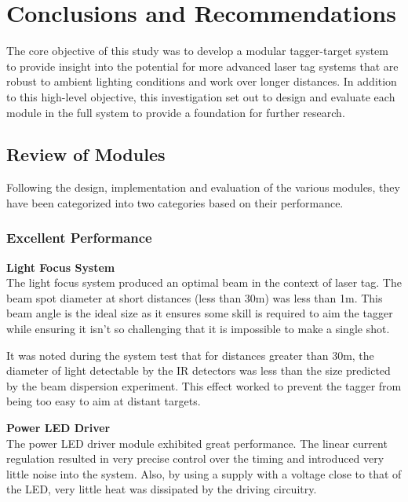\chapter{Conclusions and Recommendations}
\label{ch_conclusions}



The core objective of this study was to develop a modular tagger-target system to provide insight into the potential for more advanced laser tag systems that are robust to ambient lighting conditions and work over longer distances. In addition to this high-level objective, this investigation set out to design and evaluate each module in the full system to provide a foundation for further research.

\section{Review of Modules}
Following the design, implementation and evaluation of the various modules, they have been categorized into two categories based on their performance. %

\subsection{Excellent Performance}

\textbf{Light Focus System}\\
The light focus system produced an optimal beam in the context of laser tag. The beam spot diameter at short distances (less than 30m) was less than 1m. This beam angle is the ideal size as it ensures some skill is required to aim the tagger while ensuring it isn't so challenging that it is impossible to make a single shot.

It was noted during the system test that for distances greater than 30m, the diameter of light detectable by the IR detectors was less than the size predicted by the beam dispersion experiment. This effect worked to prevent the tagger from being too easy to aim at distant targets.

\textbf{Power LED Driver}\\
The power LED driver module exhibited great performance. The linear current regulation resulted in very precise control over the timing and introduced very little noise into the system. Also, by using a supply with a voltage close to that of the LED, very little heat was dissipated by the driving circuitry.

